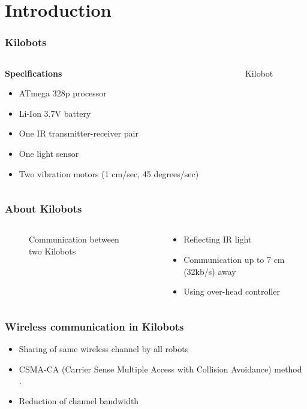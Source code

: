 \section{Introduction}
\begin{frame}
	\frametitle{Kilobots}
	\begin{columns}		
		\begin{column}{0.5\textwidth}
			\textbf{Specifications}
			\vspace{0.2cm}
			\begin{itemize}
				\item ATmega 328p processor 
				\item Li-Ion 3.7V battery 
				\item One IR transmitter-receiver pair 
				\item One light sensor 
				\item Two vibration motors (1 cm/sec, 45 degrees/sec)
			\end{itemize}
		\end{column}
	\begin{column}{0.5\textwidth}
		\begin{figure}
			\centering
			\vspace{0.2cm}
			\caption{Kilobot}
		\end{figure}
	\end{column}
	\end{columns}
\end{frame}

\begin{frame}
	\frametitle{About Kilobots \cite{kilobotics_manual}}
	\begin{columns}
		\begin{column}{0.5\textwidth}
			\begin{figure}
				\centering
				\vspace{0.2cm}
				\caption{Communication between two Kilobots}
			\end{figure}
		\end{column}
		\begin{column}{0.5\textwidth}
			\begin{itemize}
				\item Reflecting IR light
				\item Communication up to 7 cm (32kb/s) away 
				\item Using over-head controller
			\end{itemize}
		\end{column}
	\end{columns}
\end{frame}

\begin{frame}
	\frametitle{Wireless communication in Kilobots}
	\begin{itemize}
		\item Sharing of same wireless channel by all robots
		\item CSMA-CA (Carrier Sense Multiple Access with Collision Avoidance) method \cite{WEBOPEDIA-csma-cd}.
		\item Reduction of channel bandwidth        
	\end{itemize}
\end{frame}
